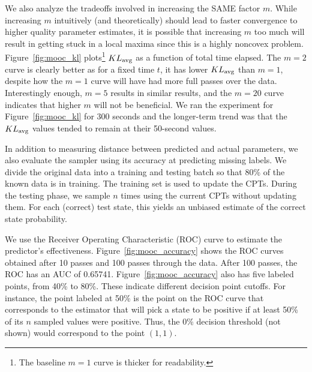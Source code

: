 \documentclass{article} %
\begin{document}
We also analyze the tradeoffs involved in increasing the SAME factor $m$. While increasing $m$
intuitively (and theoretically) should lead to faster convergence to higher quality parameter
estimates, it is possible that increasing $m$ too much will result in getting stuck in a local
maxima since this is a highly noncovex problem. Figure~\ref{fig:mooc_kl} plots\footnote{The baseline
$m=1$ curve is thicker for readability.} $KL_{\rm avg}$ as a function of total time elapsed. The
$m=2$ curve is clearly better as for a fixed time $t$, it has lower $KL_{\rm avg}$ than $m=1$,
despite how the $m=1$ curve will have had more full passes over the data. Interestingly enough,
$m=5$ results in similar results, and the $m=20$ curve indicates that higher $m$ will not be
beneficial.  We ran the experiment for Figure~\ref{fig:mooc_kl} for 300 seconds and the longer-term
trend was that the $KL_{\rm avg}$ values tended to remain at their 50-second values.

In addition to measuring distance between predicted and actual parameters, we also evaluate the
sampler using its accuracy at predicting missing labels.  We divide the original data into a
training and testing batch so that 80\% of the known data is in training. The training set is used
to update the CPTs. During the testing phase, we sample $n$ times using the current CPTs without
updating them. For each (correct) test state, this yields an unbiased estimate of the correct state
probability. 




We use the Receiver Operating Characteristic (ROC) curve to estimate the predictor's effectiveness.
Figure~\ref{fig:mooc_accuracy} shows the ROC curves obtained after 10 passes and 100 passes through
the data.  After 100 passes, the ROC has an AUC of 0.65741.  Figure~\ref{fig:mooc_accuracy} also has
five labeled points, from 40\% to 80\%.  These indicate different decision point cutoffs. For
instance, the point labeled at 50\% is the point on the ROC curve that corresponds to the estimator
that will pick a state to be positive if at least 50\% of its $n$ sampled values were positive. Thus,
the 0\% decision threshold (not shown) would correspond to the point $(1,1)$.
\end{document}
